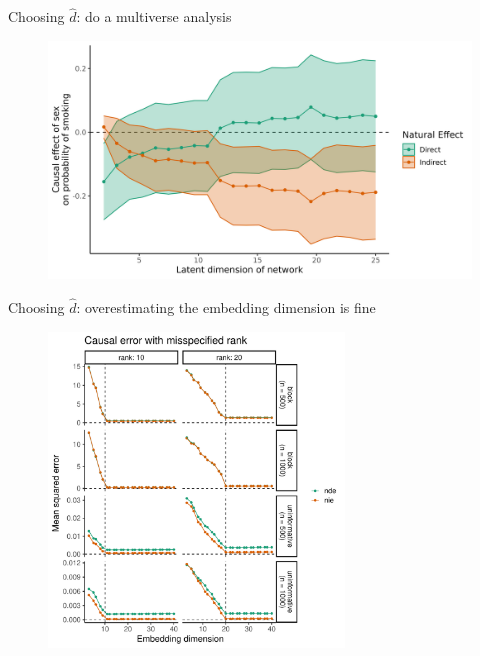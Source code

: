 \documentclass{beamer}
\theoremstyle{remark}
\begin{document}
\begin{frame}{Choosing $\widehat{d}$: do a multiverse analysis}

    \centering

    \begin{figure}
        \includegraphics[width=\textwidth]{figures/glasgow-effects.png}
    \end{figure}

\end{frame}

\begin{frame}{Choosing $\widehat{d}$: overestimating the embedding dimension is fine}

    \centering

    \begin{figure}
        \includegraphics[width=0.7\textwidth]{figures/misspecification/loss_average.pdf}
    \end{figure}

\end{frame}
\end{document}
